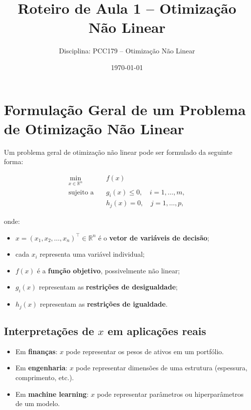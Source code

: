 \documentclass[9pt,a4paper]{extarticle}
\begin{document}
\title{Roteiro de Aula 1 -- Otimização Não Linear}
\author{Disciplina: PCC179 -- Otimização Não Linear}
\date{\today}
\maketitle

\section{Formulação Geral de um Problema de Otimização Não Linear}

Um problema geral de otimização não linear pode ser formulado da seguinte forma:

\[
\begin{aligned}
\min_{x \in \mathbb{R}^n} \quad & f(x) \\
\text{sujeito a} \quad & g_i(x) \leq 0, \quad i = 1,\dots,m, \\
& h_j(x) = 0, \quad j = 1,\dots,p,
\end{aligned}
\]

onde:
\begin{itemize}
    \item $x = (x_1, x_2, \dots, x_n)^\top \in \mathbb{R}^n$ é o \textbf{vetor de variáveis de decisão};
    \item cada $x_i$ representa uma variável individual;
    \item $f(x)$ é a \textbf{função objetivo}, possivelmente não linear;
    \item $g_i(x)$ representam as \textbf{restrições de desigualdade};
    \item $h_j(x)$ representam as \textbf{restrições de igualdade}.
\end{itemize}

\subsection*{Interpretações de $x$ em aplicações reais}
\begin{itemize}
    \item Em \textbf{finanças}: $x$ pode representar os pesos de ativos em um portfólio.
    \item Em \textbf{engenharia}: $x$ pode representar dimensões de uma estrutura (espessura, comprimento, etc.).
    \item Em \textbf{machine learning}: $x$ pode representar parâmetros ou hiperparâmetros de um modelo.
\end{itemize}
\end{document}
